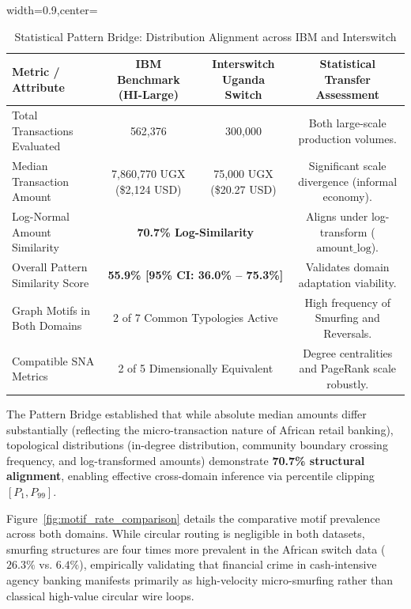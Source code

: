 \begin{table}[hbt!]
\centering
\caption{Statistical Pattern Bridge: Distribution Alignment across IBM and Interswitch}
\label{tab:pattern_bridge_stats}
\begin{adjustbox}{width=0.9\textwidth,center=\textwidth}
\begin{tabular}{|l|c|c|c|}
\hline
\rowcolor{gray!40}
\textbf{Metric / Attribute} & \textbf{IBM Benchmark (HI-Large)} & \textbf{Interswitch Uganda Switch} & \textbf{Statistical Transfer Assessment} \\
\hline
Total Transactions Evaluated & 562,376 & 300,000 & Both large-scale production volumes. \\
\hline
Median Transaction Amount & 7,860,770 UGX (\$2,124 USD) & 75,000 UGX (\$20.27 USD) & Significant scale divergence (informal economy). \\
\hline
Log-Normal Amount Similarity & \multicolumn{2}{c|}{\textbf{70.7\% Log-Similarity}} & Aligns under log-transform ($\text{amount\_log}$). \\
\hline
Overall Pattern Similarity Score & \multicolumn{2}{c|}{\textbf{55.9\% [95\% CI: 36.0\% -- 75.3\%]}} & Validates domain adaptation viability. \\
\hline
Graph Motifs in Both Domains & \multicolumn{2}{c|}{2 of 7 Common Typologies Active} & High frequency of Smurfing and Reversals. \\
\hline
Compatible SNA Metrics & \multicolumn{2}{c|}{2 of 5 Dimensionally Equivalent} & Degree centralities and PageRank scale robustly. \\
\hline
\end{tabular}
\end{adjustbox}
\end{table}

The Pattern Bridge established that while absolute median amounts differ substantially (reflecting the micro-transaction nature of African retail banking), topological distributions (in-degree distribution, community boundary crossing frequency, and log-transformed amounts) demonstrate \textbf{70.7\% structural alignment}, enabling effective cross-domain inference via percentile clipping $[P_1, P_{99}]$.

Figure~\ref{fig:motif_rate_comparison} details the comparative motif prevalence across both domains. While circular routing is negligible in both datasets, smurfing structures are four times more prevalent in the African switch data ($26.3\%$ vs. $6.4\%$), empirically validating that financial crime in cash-intensive agency banking manifests primarily as high-velocity micro-smurfing rather than classical high-value circular wire loops.

